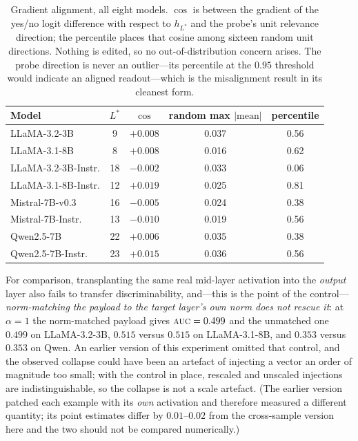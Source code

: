 \documentclass[11pt]{article}
\newcommand{\auc}{\textsc{auc}}
\begin{document}
\begin{table}[t]
\centering\small
\caption{Gradient alignment, all eight models. $\cos$ is between the gradient of
the yes/no logit difference with respect to $h_{L^*}$ and the probe's unit
relevance direction; the percentile places that cosine among sixteen random unit
directions. Nothing is edited, so no out-of-distribution concern arises. The
probe direction is never an outlier---its percentile at the $0.95$ threshold
would indicate an aligned readout---which is the misalignment result in its
cleanest form.}
\label{tab:grad}
\begin{tabular}{lcccc}
\toprule
Model & $L^*$ & $\cos$ & random max $|\text{mean}|$ & percentile \\
\midrule
LLaMA-3.2-3B        & 9  & $+0.008$ & 0.037 & 0.56 \\
LLaMA-3.1-8B        & 8  & $+0.008$ & 0.016 & 0.62 \\
LLaMA-3.2-3B-Instr. & 18 & $-0.002$ & 0.033 & 0.06 \\
LLaMA-3.1-8B-Instr. & 12 & $+0.019$ & 0.025 & 0.81 \\
Mistral-7B-v0.3     & 16 & $-0.005$ & 0.024 & 0.38 \\
Mistral-7B-Instr.   & 13 & $-0.010$ & 0.019 & 0.56 \\
Qwen2.5-7B          & 22 & $+0.006$ & 0.035 & 0.38 \\
Qwen2.5-7B-Instr.   & 23 & $+0.015$ & 0.036 & 0.56 \\
\bottomrule
\end{tabular}
\end{table}

For comparison, transplanting the same real mid-layer activation into the
\emph{output} layer also fails to transfer discriminability, and---this is the
point of the control---\emph{norm-matching the payload to the target layer's own
norm does not rescue it}: at $\alpha{=}1$ the norm-matched payload gives
$\auc=0.499$ and the unmatched one $0.499$ on LLaMA-3.2-3B, $0.515$ versus
$0.515$ on LLaMA-3.1-8B, and $0.353$ versus $0.353$ on Qwen. An earlier version
of this experiment omitted that control, and the observed collapse could have
been an artefact of injecting a vector an order of magnitude too small; with the
control in place, rescaled and unscaled injections are indistinguishable, so the
collapse is not a scale artefact. (The earlier version patched each example with
its \emph{own} activation and therefore measured a different quantity; its point
estimates differ by $0.01$--$0.02$ from the cross-sample version here and the two
should not be compared numerically.)
\end{document}
